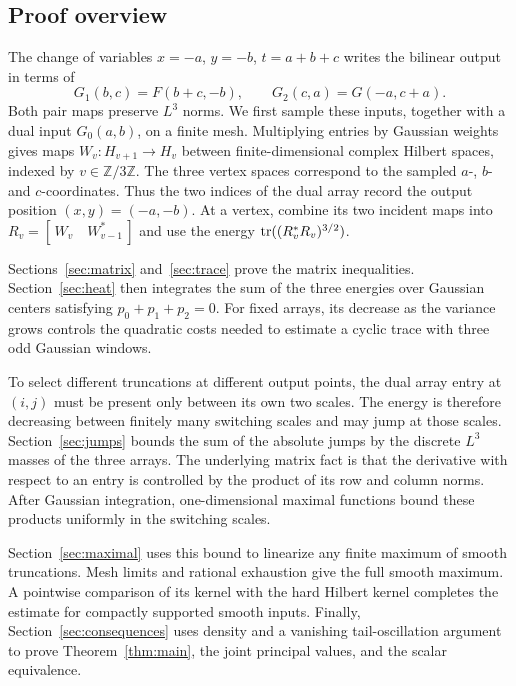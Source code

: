 \subsection{Proof overview}

The change of variables $x=-a$, $y=-b$, $t=a+b+c$ writes the bilinear
output in terms of
\[
 G_1(b,c)=F(b+c,-b),\qquad G_2(c,a)=G(-a,c+a).
\]
Both pair maps preserve $L^3$ norms. We first sample these inputs,
together with a dual input $G_0(a,b)$, on a finite mesh. Multiplying
entries by Gaussian weights gives maps $W_v:H_{v+1}\to H_v$ between
finite-dimensional complex Hilbert spaces, indexed by
$v\in\mathbb Z/3\mathbb Z$.
The three vertex spaces correspond to the sampled $a$-, $b$- and
$c$-coordinates. Thus the two indices of the dual array record the
output position $(x,y)=(-a,-b)$.
At a vertex, combine its two incident maps into
$R_v=[\,W_v\quad W_{v-1}^*\,]$ and use the energy
$\operatorname{tr}((R_v^*R_v)^{3/2})$.

Sections~\ref{sec:matrix} and~\ref{sec:trace} prove the matrix
inequalities. Section~\ref{sec:heat} then integrates the sum of the
three energies over Gaussian centers satisfying $p_0+p_1+p_2=0$.
For fixed arrays, its decrease as the variance grows controls the quadratic
costs needed to estimate a cyclic trace with three odd Gaussian windows.

To select different truncations at different output points, the dual
array entry at $(i,j)$ must be present only between its own two scales.
The energy is therefore decreasing between finitely many switching
scales and may jump at those scales. Section~\ref{sec:jumps} bounds
the sum of the absolute jumps by the discrete $L^3$ masses of the three
arrays. The underlying matrix fact is that the derivative with respect
to an entry is controlled by the product of its row and column norms.
After Gaussian integration, one-dimensional maximal functions bound
these products uniformly in the switching scales.

Section~\ref{sec:maximal} uses this bound to linearize any finite
maximum of smooth truncations. Mesh limits and rational exhaustion
give the full smooth maximum. A pointwise comparison of its kernel
with the hard Hilbert kernel completes the estimate for compactly
supported smooth inputs. Finally, Section~\ref{sec:consequences}
uses density and a vanishing tail-oscillation argument to prove
Theorem~\ref{thm:main}, the joint principal values, and the scalar
equivalence.
